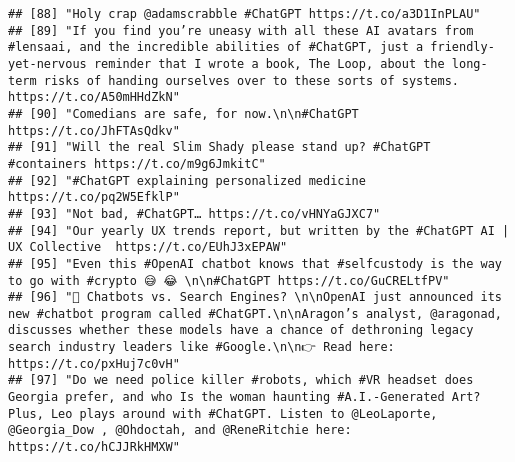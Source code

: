 \documentclass[
]{article}
\begin{document}
\begin{verbatim}
## [88] "Holy crap @adamscrabble #ChatGPT https://t.co/a3D1InPLAU"                                                                                                                                                                                                                                                                       
## [89] "If you find you’re uneasy with all these AI avatars from #lensaai, and the incredible abilities of #ChatGPT, just a friendly-yet-nervous reminder that I wrote a book, The Loop, about the long-term risks of handing ourselves over to these sorts of systems. https://t.co/A50mHHdZkN"                                        
## [90] "Comedians are safe, for now.\n\n#ChatGPT https://t.co/JhFTAsQdkv"                                                                                                                                                                                                                                                               
## [91] "Will the real Slim Shady please stand up? #ChatGPT #containers https://t.co/m9g6JmkitC"                                                                                                                                                                                                                                         
## [92] "#ChatGPT explaining personalized medicine https://t.co/pq2W5EfklP"                                                                                                                                                                                                                                                              
## [93] "Not bad, #ChatGPT… https://t.co/vHNYaGJXC7"                                                                                                                                                                                                                                                                                     
## [94] "Our yearly UX trends report, but written by the #ChatGPT AI | UX Collective  https://t.co/EUhJ3xEPAW"                                                                                                                                                                                                                           
## [95] "Even this #OpenAI chatbot knows that #selfcustody is the way to go with #crypto 😅 😂 \n\n#ChatGPT https://t.co/GuCRELtfPV"                                                                                                                                                                                                     
## [96] "🔎 Chatbots vs. Search Engines? \n\nOpenAI just announced its new #chatbot program called #ChatGPT.\n\nAragon’s analyst, @aragonad, discusses whether these models have a chance of dethroning legacy search industry leaders like #Google.\n\n👉 Read here: https://t.co/pxHuj7c0vH"                                           
## [97] "Do we need police killer #robots, which #VR headset does Georgia prefer, and who Is the woman haunting #A.I.-Generated Art? Plus, Leo plays around with #ChatGPT. Listen to @LeoLaporte, @Georgia_Dow , @Ohdoctah, and @ReneRitchie here: https://t.co/hCJJRkHMXW"
\end{verbatim}
\end{document}
